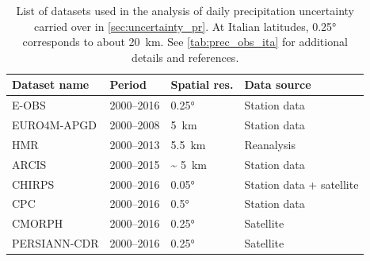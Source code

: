 \begin{table}[]
\centering
\begin{tabular}{@{}llll@{}}
\toprule
Dataset name & Period & Spatial res. & Data source \\ \midrule
E-OBS        & 2000--2016 & \ang{0.25}                            & Station data \\
EURO4M-APGD  & 2000--2008 & \SI{5}{\kilo\metre}                   & Station data \\
HMR          & 2000--2013 & \SI{5.5}{\kilo\metre}                 & Reanalysis \\
ARCIS        & 2000--2015 & \textasciitilde{} \SI{5}{\kilo\metre} & Station data \\
CHIRPS       & 2000--2016 & \ang{0.05}                            & Station data + satellite \\
CPC          & 2000--2016 & \ang{0.5}                             & Station data \\
CMORPH       & 2000--2016 & \ang{0.25}                            & Satellite \\
PERSIANN-CDR & 2000--2016 & \ang{0.25}                            & Satellite \\ \bottomrule
\end{tabular}
\caption[Precipitation datasets used in uncertainty analysis over Italy]{List of datasets used in the analysis of daily precipitation uncertainty carried over in \cref{sec:uncertainty_pr}. At Italian latitudes, \ang{0.25} corresponds to about \SI{20}{\kilo\meter}. See \cref{tab:prec_obs_ita} for additional details and references.}\label{tab:uncertainty_pr}
\end{table}

